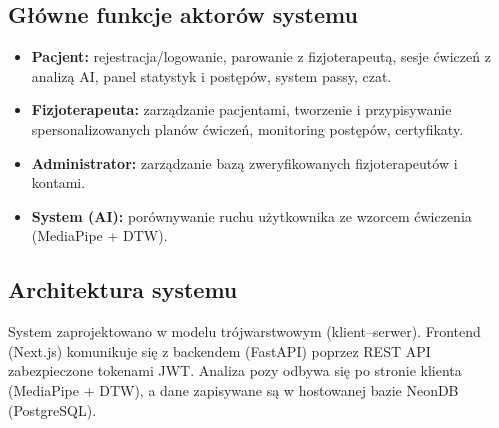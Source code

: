 \documentclass[11pt,a4paper]{article}
\begin{document}
\subsection{Główne funkcje aktorów systemu}
\begin{itemize}
  \item \textbf{Pacjent:} rejestracja/logowanie, parowanie z fizjoterapeutą, sesje ćwiczeń z analizą AI, panel statystyk i postępów, system passy, czat.
  \item \textbf{Fizjoterapeuta:} zarządzanie pacjentami, tworzenie i przypisywanie spersonalizowanych planów ćwiczeń, monitoring postępów, certyfikaty.
  \item \textbf{Administrator:} zarządzanie bazą zweryfikowanych fizjoterapeutów i kontami.
  \item \textbf{System (AI):} porównywanie ruchu użytkownika ze wzorcem ćwiczenia (MediaPipe + DTW).
\end{itemize}

\subsection{Architektura systemu}
System zaprojektowano w modelu trójwarstwowym (klient–serwer). Frontend (Next.js) komunikuje się z backendem (FastAPI) poprzez REST API zabezpieczone tokenami JWT. Analiza pozy odbywa się po stronie klienta (MediaPipe + DTW), a dane zapisywane są w hostowanej bazie NeonDB (PostgreSQL).
\end{document}
